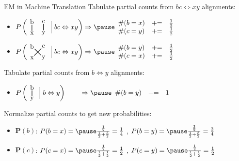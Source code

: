 \documentclass[14pt]{beamer}
\newcommand{\bxcyalignment}{
\begin{tikzpicture}[baseline=-0.25em,inner sep=0.1em]
  \node (b) at (-0.3,0.3) {b};
  \node (c) at (0.3,0.3)  {c};
  \node (x) at (-0.3,-0.3)  {x};
  \node (y) at (0.3,-0.3) {y};
  \draw[thick] (b) -- (x);
  \draw[thick] (c) -- (y);
\end{tikzpicture}
}
\newcommand{\bycxalignment}{
\begin{tikzpicture}[baseline=-0.25em,inner sep=0.1em]
  \node (b) at (-0.3,0.3) {b};
  \node (c) at (0.3,0.3)  {c};
  \node (x) at (-0.3,-0.3)  {x};
  \node (y) at (0.3,-0.3) {y};
  \draw[thick] (b) -- (y);
  \draw[thick] (c) -- (x);
\end{tikzpicture}
}
\newcommand{\byalignment}{
\begin{tikzpicture}[baseline=-0.25em,inner sep=0.1em]
  \node (b) at (0,0.3) {b};
  \node (y) at (0,-0.3) {y};
  \draw[thick] (b) -- (y);
\end{tikzpicture}
}
\begin{document}
\begin{frame}{EM in Machine Translation}
\renewcommand{\arraystretch}{1.2}
Tabulate partial counts from $b c \Leftrightarrow x y$ alignments:
\begin{itemize}
\item $P\left(\text{\bxcyalignment} \Bigm | bc \Leftrightarrow xy \right) \Rightarrow
\pause
\begin{array} { l l l }
\#(b=x) & \mathrel{+}= & \frac{1}{2} \\
\#(c=y) & \mathrel{+}= & \frac{1}{2} \\
\end{array}$
\pause
\item $P\left(\text{\bycxalignment} \Bigm | bc \Leftrightarrow xy \right) \Rightarrow
\pause
\begin{array} { l l l }
\#(b=y) & \mathrel{+}= & \frac{1}{2} \\
\#(c=x) & \mathrel{+}= & \frac{1}{2} \\
\end{array}$
\end{itemize}
\pause
Tabulate partial counts from $b \Leftrightarrow y$ alignments:
\begin{itemize}
\item $P\left(\text{\byalignment} \Bigm | b \Leftrightarrow y \right) \hspace{2.2em} \Rightarrow
\pause
\begin{array}{ l l l }
\#(b=y) & \mathrel{+}= & 1
\end{array}$
\end{itemize}
\pause
Normalize partial counts to get new probabilities:
\begin{itemize}
\thickmuskip=1mu
\item $\mathbf{P}(b)$:
$P(b=x) = \pause\frac{\frac{1}{2}}{\frac{1}{2} + \frac{3}{2}} = \frac{1}{4}$
\pause,
$P(b=y) = \pause\frac{\frac{3}{2}}{\frac{1}{2} + \frac{3}{2}} = \frac{3}{4}$
\pause
\item $\mathbf{P}(c)$:
$P(c=x) = \pause\frac{\frac{1}{2}}{\frac{1}{2} + \frac{1}{2}} = \frac{1}{2}$
\pause,
$P(c=y) = \pause\frac{\frac{1}{2}}{\frac{1}{2} + \frac{1}{2}} = \frac{1}{2}$
\end{itemize}
\end{frame}
\end{document}

